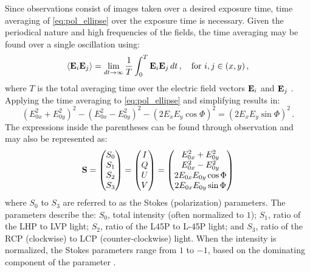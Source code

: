 Since observations consist of images taken over a desired exposure time, time averaging of \autoref{eq:pol_ellipse} over the exposure time is necessary. Given the periodical nature and high frequencies of the fields, the time averaging may be found over a single oscillation using:
\begin{equation}
    \left< \mathbf{E}_{i} \mathbf{E}_{j} \right> = \lim_{dt \rightarrow \infty} \frac{1}{T} \int_{0}^{T} \mathbf{E}_{i} \mathbf{E}_{j}\,dt\,,\quad \text{for } i, j \in (x, y)\,,\label{eq:pol_t_avg}
\end{equation}
where $T$ is the total averaging time over the electric field vectors $\mathbf{E}_{i}$ and $\mathbf{E}_{j}$ \citep{field_guide}. Applying the time averaging to \autoref{eq:pol_ellipse} and simplifying results in:
\begin{equation}
    (E_{0x}^{2} + E_{0y}^{2})^{2} - (E_{0x}^{2} - E_{0y}^{2})^{2} - (2 E_{x} E_{y} \cos \Phi)^{2} = (2 E_{x} E_{y} \sin \Phi)^{2}\,.\label{eq:pol_ellipse_alt}
\end{equation}
The expressions inside the parentheses can be found through observation and may also be represented as:
\begin{equation}
    \mathbf{S} =
    \begin{pmatrix}
        S_{0} \\
        S_{1} \\
        S_{2} \\
        S_{3}
    \end{pmatrix}
    =
    \begin{pmatrix}
        I \\
        Q \\
        U \\
        V
    \end{pmatrix}
    =
    \begin{pmatrix}
        E_{0x}^{2} + E_{0y}^{2}   \\
        E_{0x}^{2} - E_{0y}^{2}   \\
        2 E_{0x} E_{0y} \cos \Phi \\
        2 E_{0x} E_{0y} \sin \Phi
    \end{pmatrix}
    \label{eq:Stokes_params}
\end{equation}
where $S_{0}$ to $ S_{3}$ are referred to as the Stokes (polarization) parameters. The parameters describe the: $S_{0}$, total intensity (often normalized to $1$); $S_{1}$, ratio of the \gls{LHP} to \gls{LVP} light; $S_{2}$, ratio of the \gls{L45P} to \gls{L-45P} light; and $S_{3}$, ratio of the \gls{RCP} (clockwise) to \gls{LCP} (counter-clockwise) light. When the intensity is normalized, the Stokes parameters range from $1$ to $-1$, based on the dominating component of the parameter \citep{Stokes, chandrasekhar}.

